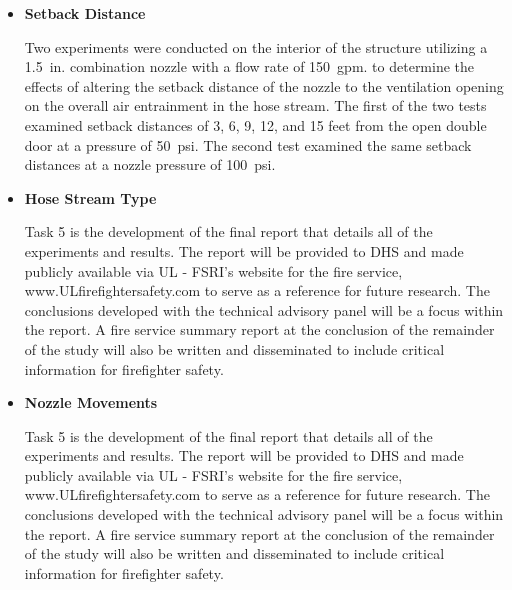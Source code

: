 \documentclass{article}
\begin{document}
\begin{itemize}

\item \bf{Setback Distance}
\normalfont
\vspace*{\baselineskip}

Two experiments were conducted on the interior of the structure utilizing a 1.5~in. combination nozzle with a flow rate of 150~gpm. to determine the effects of altering the setback distance of the nozzle to the ventilation opening on the overall air entrainment in the hose stream. The first of the two tests examined setback distances of 3, 6, 9, 12, and 15 feet from the open double door at a pressure of 50~psi. The second test examined the same setback distances at a nozzle pressure of 100~psi.  

\vspace*{\baselineskip}

\item \bf{Hose Stream Type}
\normalfont
\vspace*{\baselineskip}

Task 5 is the development of the final report that details all of the experiments and results. The report will be provided to DHS and made publicly available via UL - FSRI's website for the fire service, www.ULfirefightersafety.com to serve as a reference for future research. The conclusions developed with the technical advisory panel will be a focus within the report. A fire service summary report at the conclusion of the remainder of the study will also be written and disseminated to include critical information for firefighter safety.
\vspace*{\baselineskip}

\item \bf{Nozzle Movements}
\normalfont
\vspace*{\baselineskip}

Task 5 is the development of the final report that details all of the experiments and results. The report will be provided to DHS and made publicly available via UL - FSRI's website for the fire service, www.ULfirefightersafety.com to serve as a reference for future research. The conclusions developed with the technical advisory panel will be a focus within the report. A fire service summary report at the conclusion of the remainder of the study will also be written and disseminated to include critical information for firefighter safety.
\vspace*{\baselineskip}

\end{itemize}
\end{document}
